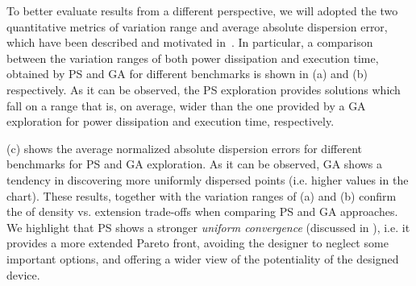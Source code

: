 To better evaluate results from a different perspective, we will
adopted the two quantitative metrics of variation range and average absolute
dispersion error, which have been described and motivated
in~. In particular, a comparison between the variation
ranges of both power dissipation and execution time, obtained by PS
and GA for different benchmarks is shown in (a) and
(b) respectively.  As it can be observed, the PS exploration provides
solutions which fall on a range that is, on average, wider than the
one provided by a GA exploration for power dissipation and execution
time, respectively.

\begin{figure}
  \begin{center}
  \end{center}
\end{figure}

(c) shows the average normalized absolute dispersion
errors for different benchmarks for PS and GA exploration.  As it can
be observed, GA shows a tendency in discovering more uniformly
dispersed points (i.e. higher values in the chart). These results,
together with the variation ranges of (a) and (b)
confirm the of density vs. extension trade-offs when comparing PS and
GA approaches. We highlight that PS shows a stronger \emph{uniform convergence} (discussed in ), i.e. it provides a more extended Pareto front, avoiding the designer to neglect some important options, and offering a wider view of the potentiality of the designed device.

